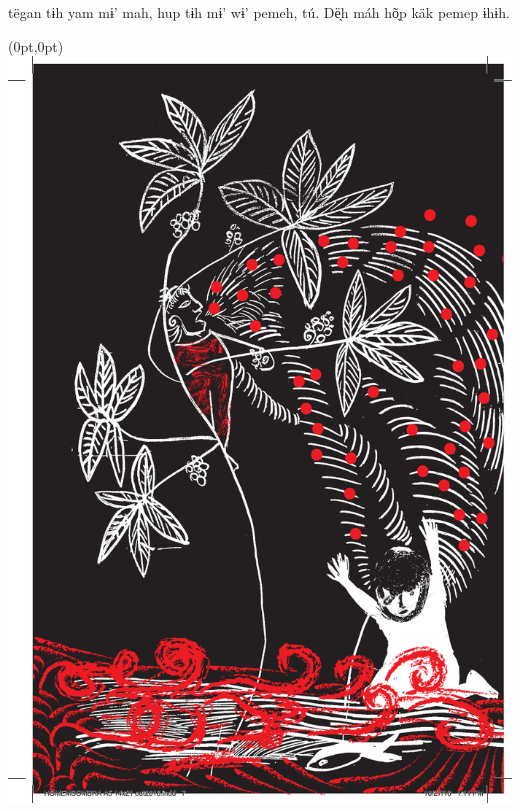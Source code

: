 \vspace{2em}

 tëgan tɨh yam mɨ’ mah,
hup tɨh mɨ’ wɨ’ pemeh, tú.
Dë̖h máh hõ̖p käk pemep ɨhɨh.

\vspace*{\fill}

\pagebreak

\begin{textblock*}{8in}(0pt,0pt)%
\vspace*{-2.8cm}
\hspace*{-3.2cm}\includegraphics[width=153mm]{./imgs/img2.pdf}
\end{textblock*}

\chapter*{}

